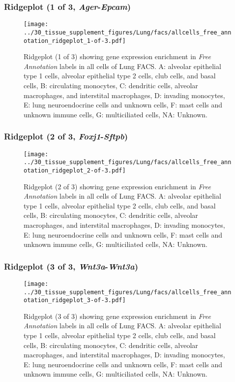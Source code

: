 \subsubsection{Ridgeplot (1 of 3, \emph{Ager}-\emph{Epcam})}
\begin{figure}[h]
\centering
\texttt{[image: ../30\_tissue\_supplement\_figures/Lung/facs/allcells\_free\_annotation\_ridgeplot\_1-of-3.pdf]}

\caption{ Ridgeplot (1 of 3)  showing gene expression enrichment in \emph{Free Annotation} labels in all cells of Lung FACS. A: alveolar epithelial type 1 cells, alveolar epithelial type 2 cells, club cells, and basal cells, B: circulating monocytes, C: dendritic cells, alveolar macrophages, and interstital macrophages, D: invading monocytes, E: lung neuroendocrine cells and unknown cells, F: mast cells and unknown immune cells, G: multiciliated cells, NA: Unknown.}
\end{figure}


\clearpage

\subsubsection{Ridgeplot (2 of 3, \emph{Foxj1}-\emph{Sftpb})}
\begin{figure}[h]
\centering
\texttt{[image: ../30\_tissue\_supplement\_figures/Lung/facs/allcells\_free\_annotation\_ridgeplot\_2-of-3.pdf]}

\caption{ Ridgeplot (2 of 3)  showing gene expression enrichment in \emph{Free Annotation} labels in all cells of Lung FACS. A: alveolar epithelial type 1 cells, alveolar epithelial type 2 cells, club cells, and basal cells, B: circulating monocytes, C: dendritic cells, alveolar macrophages, and interstital macrophages, D: invading monocytes, E: lung neuroendocrine cells and unknown cells, F: mast cells and unknown immune cells, G: multiciliated cells, NA: Unknown.}
\end{figure}


\clearpage

\subsubsection{Ridgeplot (3 of 3, \emph{Wnt3a}-\emph{Wnt3a})}
\begin{figure}[h]
\centering
\texttt{[image: ../30\_tissue\_supplement\_figures/Lung/facs/allcells\_free\_annotation\_ridgeplot\_3-of-3.pdf]}

\caption{ Ridgeplot (3 of 3)  showing gene expression enrichment in \emph{Free Annotation} labels in all cells of Lung FACS. A: alveolar epithelial type 1 cells, alveolar epithelial type 2 cells, club cells, and basal cells, B: circulating monocytes, C: dendritic cells, alveolar macrophages, and interstital macrophages, D: invading monocytes, E: lung neuroendocrine cells and unknown cells, F: mast cells and unknown immune cells, G: multiciliated cells, NA: Unknown.}
\end{figure}


